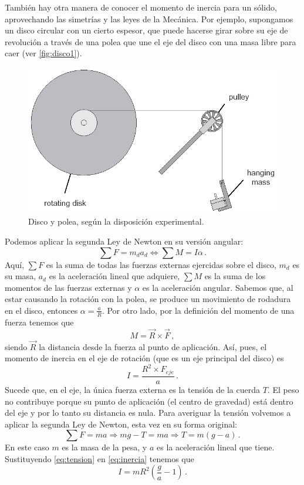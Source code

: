 \documentclass[a4paper]{article}
\begin{document}
También hay otra manera de conocer el momento de inercia para un sólido, aprovechando las simetrías y las leyes de la Mecánica. Por ejemplo, supongamos un disco circular con un cierto espesor, que puede hacerse girar sobre su eje de revolución a través de una polea que une el eje del disco con una masa libre para caer (ver \autoref{fig:disco1}).
\begin{figure}[h]
\begin{center}
\includegraphics[width=10 cm]{disco1.png}
\caption{Disco y polea, según la disposición experimental.}
\label{fig:disco1}
\end{center}
\end{figure}
Podemos aplicar la segunda Ley de Newton en su versión angular:
\begin{equation}
\sum F=m_d a_d\Leftrightarrow \sum M=I\alpha\,.
\end{equation}
Aquí, $\sum F$ es la suma de todas las fuerzas externas ejercidas sobre el disco, $m_d$ es su masa, $a_d$ es la aceleración lineal que adquiere, $\sum M$ es la suma de los momentos de las fuerzas externas  y $\alpha$ es la aceleración angular.
Sabemos que, al estar causando la rotación con la polea, se produce un movimiento de rodadura en el disco, entonces $\alpha=\frac{a}{R}$. Por otro lado, por la definición del momento de una fuerza tenemos que 
\begin{equation}
M=\vec{R}\times\vec{F}\,,
\label{eq:defM}
\end{equation}
siendo $\vec{R}$ la distancia desde la fuerza al punto de aplicación. Así, pues, el momento de inercia en el eje de rotación (que es un eje principal del disco) es 
\begin{equation}
I=\frac{R^2\times F_{eje}}{a}\,.
\label{eq:inercia}
\end{equation}
Sucede que, en el eje, la única fuerza externa es la tensión de la cuerda $T$. El peso no contribuye porque su punto de aplicación (el centro de gravedad) está dentro del eje y por lo tanto su distancia es nula. Para averiguar la tensión volvemos a aplicar la segunda Ley de Newton, esta vez en su forma original:
\begin{equation}
\sum F=ma\Rightarrow mg-T=ma\Rightarrow T=m\left(g-a\right)\,.
\label{eq:tension}
\end{equation}
En este caso $m$ es la masa de la pesa, y $a$ es la aceleración lineal que tiene. Sustituyendo \eqref{eq:tension} en \eqref{eq:inercia} tenemos que 
\begin{equation}
I=mR^2\left(\frac{g}{a}-1\right)\,.
\label{eq:inerciadisco}
\end{equation}
\end{document}
